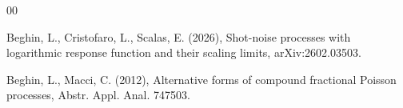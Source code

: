 \documentclass[12pt, twoside, english, headsepline]{article}
\theoremstyle{definition} %
\numberwithin{equation}{section} %
\begin{document}


\footnotesize{
\begin{thebibliography}{00}
%
%
%
%
%
%
%

Beghin, L., Cristofaro, L., Scalas, E. (2026), Shot-noise processes with logarithmic response function and their scaling limits, arXiv:2602.03503.

Beghin, L., Macci, C. (2012), Alternative forms of compound fractional Poisson processes, Abstr. Appl. Anal. 747503.


\end{thebibliography}}
\end{document}
